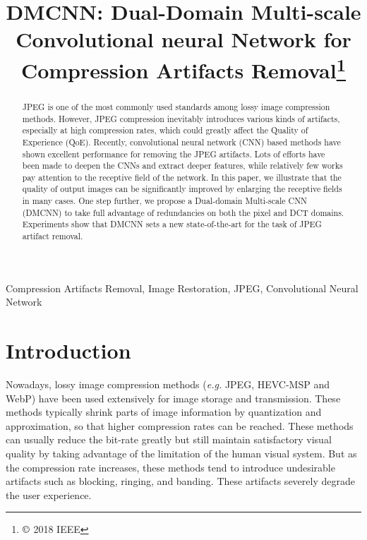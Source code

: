 \documentclass{article}
\title{DMCNN: Dual-Domain Multi-scale Convolutional neural Network 
for Compression Artifacts Removal\thanks{$\copyright$ 2018 IEEE}}
\begin{document}
%
\maketitle
%
\vspace{-0.2cm}
\begin{abstract}
JPEG is one of the most commonly used standards among lossy image compression
methods. However, JPEG compression inevitably introduces various kinds of
artifacts, especially at high compression rates, which could greatly affect
the Quality of Experience (QoE). Recently, convolutional neural network (CNN)
based methods have shown excellent performance for removing the JPEG artifacts.
Lots of efforts have been made to deepen the CNNs and extract deeper features,
while relatively few works pay attention to the receptive field of the network.
In this paper, we illustrate that the quality of output images can be
significantly improved by enlarging the receptive fields in many cases.
One step further, we propose a Dual-domain Multi-scale CNN (DMCNN) to
take full advantage of redundancies on both the pixel and DCT domains.
Experiments show that DMCNN sets a new state-of-the-art for the task of
JPEG artifact removal.
\end{abstract}
%
\begin{keywords}
Compression Artifacts Removal, Image Restoration, JPEG, Convolutional Neural
Network
\end{keywords}
%
\vspace{-0.2cm}
\section{Introduction}
\label{sec:intro}
Nowadays, lossy image compression methods (\textit{e.g.} JPEG, HEVC-MSP and WebP)
have been used extensively for image storage and transmission.
These methods typically shrink parts of image information by quantization
and approximation, so that higher compression rates can be reached. These
methods can usually reduce the bit-rate greatly but still maintain satisfactory
visual quality by taking advantage of the limitation of the
human visual system. But as the compression rate increases, these methods
tend to introduce undesirable artifacts such as
blocking, ringing, and banding. These artifacts severely degrade
the user experience.
\end{document}

